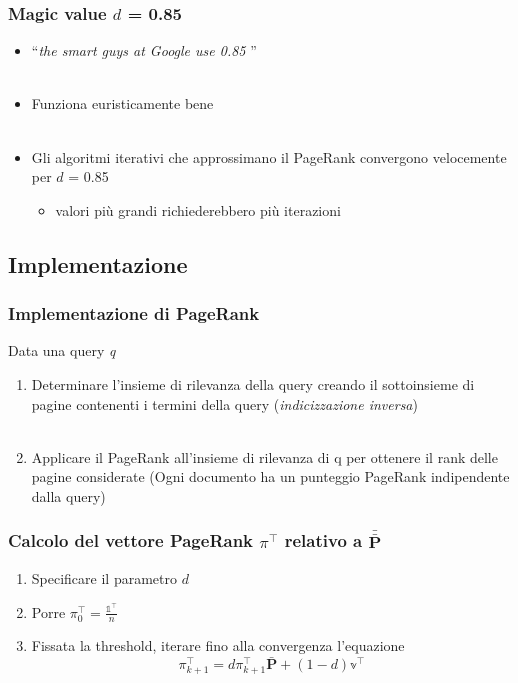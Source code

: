 \documentclass{beamer}
\begin{document}
\begin{frame}
	\frametitle{Magic value $d$ = 0.85}
	\begin{itemize}
		\item ``\emph{the smart guys at Google use 0.85} '' \\~\\
		\item Funziona euristicamente bene \\~\\
		\item Gli algoritmi iterativi che approssimano il PageRank convergono velocemente per $d$ = 0.85
		\begin{itemize}
			\item valori più grandi richiederebbero più iterazioni
		\end{itemize}
\end{itemize}
\end{frame}
\subsection{Implementazione}
\begin{frame}
	\frametitle{Implementazione di PageRank}
	Data una query \emph{q}
	\begin{enumerate}
		\item Determinare l'insieme di rilevanza della query creando il sottoinsieme di pagine contenenti i termini della query (\emph{indicizzazione inversa})\\~\\
		\item Applicare il PageRank all'insieme di rilevanza di q per ottenere il rank delle pagine considerate (Ogni documento ha un punteggio PageRank indipendente dalla query)
	\end{enumerate}
\end{frame}
\begin{frame}
	\frametitle{Calcolo del vettore PageRank $\pi^\intercal$ relativo a $\bar{\bar{\textbf{P}}}$}
	\begin{enumerate}
		\item Specificare il parametro $d$
		\item Porre $\pi_0^\intercal=\frac{\mathbb{1}^\intercal}{n}$
		\item Fissata la threshold, iterare fino alla convergenza l'equazione $$\pi_{k+1}^\intercal = d \pi_{k+1}^\intercal \bar{\textbf{P}} + (1- d) \mathbb{v}^\intercal  $$
	\end{enumerate}
\end{frame}
\end{document}
